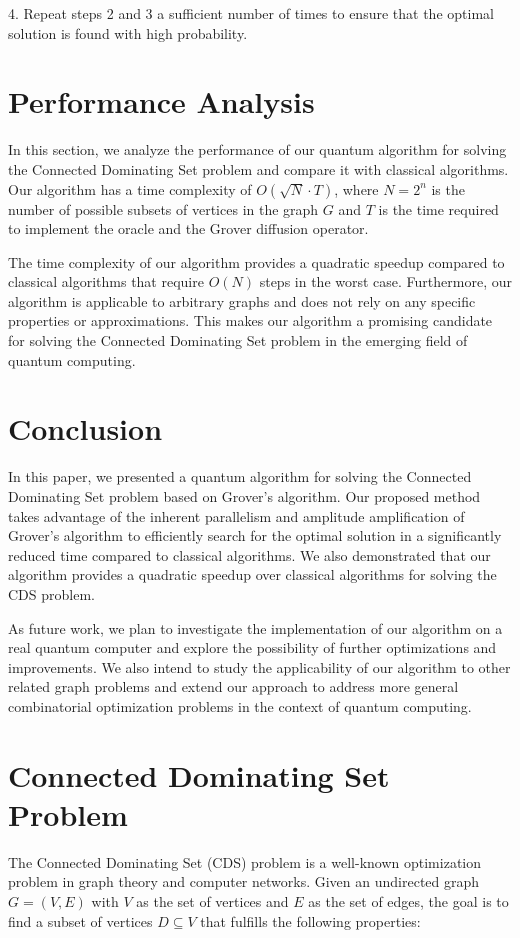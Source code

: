 4. Repeat steps 2 and 3 a sufficient number of times to ensure that the optimal solution is found with high probability.

\section{Performance Analysis}
\label{sec:analysis}

In this section, we analyze the performance of our quantum algorithm for solving the Connected Dominating Set problem and compare it with classical algorithms. Our algorithm has a time complexity of $O(\sqrt{N} \cdot T)$, where $N = 2^n$ is the number of possible subsets of vertices in the graph $G$ and $T$ is the time required to implement the oracle and the Grover diffusion operator.

The time complexity of our algorithm provides a quadratic speedup compared to classical algorithms that require $O(N)$ steps in the worst case. Furthermore, our algorithm is applicable to arbitrary graphs and does not rely on any specific properties or approximations. This makes our algorithm a promising candidate for solving the Connected Dominating Set problem in the emerging field of quantum computing.

\section{Conclusion}
\label{sec:conclusion}

In this paper, we presented a quantum algorithm for solving the Connected Dominating Set problem based on Grover's algorithm. Our proposed method takes advantage of the inherent parallelism and amplitude amplification of Grover's algorithm to efficiently search for the optimal solution in a significantly reduced time compared to classical algorithms. We also demonstrated that our algorithm provides a quadratic speedup over classical algorithms for solving the CDS problem.

As future work, we plan to investigate the implementation of our algorithm on a real quantum computer and explore the possibility of further optimizations and improvements. We also intend to study the applicability of our algorithm to other related graph problems and extend our approach to address more general combinatorial optimization problems in the context of quantum computing.

\section{Connected Dominating Set Problem}
The Connected Dominating Set (CDS) problem is a well-known optimization problem in graph theory and computer networks. Given an undirected graph $G=(V, E)$ with $V$ as the set of vertices and $E$ as the set of edges, the goal is to find a subset of vertices $D \subseteq V$ that fulfills the following properties:

